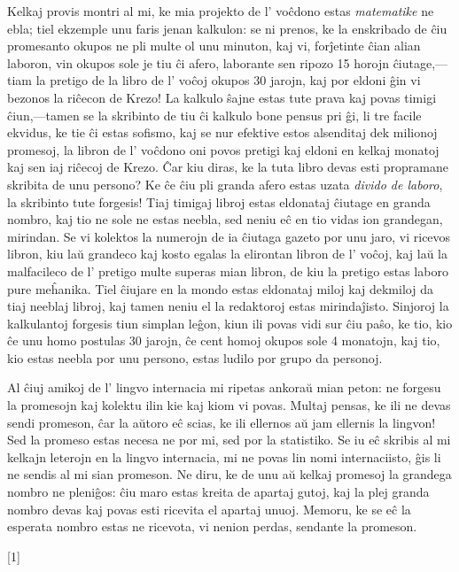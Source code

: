 \documentclass[ngerman,12pt,twoside]{book}
\begin{document}
Kelkaj provis montri al mi, ke mia projekto de l' voĉdono estas \emph{matematike} ne ebla; tiel ekzemple unu faris jenan kalkulon: \glqq{}se ni prenos, ke la enskribado de ĉiu promesanto okupos ne pli multe ol unu minuton, kaj vi, forĵetinte ĉian alian laboron, vin okupos sole je tiu ĉi afero, laborante sen ripozo 15 horojn ĉiutage,---tiam la pretigo de la libro de l' voĉoj okupos 30 jarojn, kaj por eldoni ĝin vi bezonos la riĉecon de Krezo!\grqq{} La kalkulo ŝajne estas tute prava kaj povas timigi ĉiun,---tamen se la skribinto de tiu ĉi kalkulo bone pensus pri ĝi, li tre facile ekvidus, ke tie ĉi estas sofismo, kaj se nur efektive estos alsenditaj dek milionoj promesoj, la libron de l' voĉdono oni povos pretigi kaj eldoni en kelkaj monatoj kaj sen iaj riĉecoj de Krezo. Ĉar kiu diras, ke la tuta libro devas esti propramane skribita de unu persono? Ke ĉe ĉiu pli granda afero estas uzata \emph{divido de laboro}, la skribinto tute forgesis! Tiaj \glqq{}timigaj\grqq{} libroj estas eldonataj ĉiutage en granda nombro, kaj tio ne sole ne estas neebla, sed neniu eĉ en tio vidas ion grandegan, mirindan. Se vi kolektos la numerojn de ia ĉiutaga gazeto por unu jaro, vi ricevos libron, kiu laŭ grandeco kaj kosto egalas la elirontan libron de l' voĉoj, kaj laŭ la malfacileco de l' pretigo multe superas mian libron, de kiu la pretigo estas laboro pure meĥanika. Tiel ĉiujare en la mondo estas eldonataj miloj kaj dekmiloj da tiaj \glqq{}neeblaj\grqq{} libroj, kaj tamen neniu el la redaktoroj estas mirindaĵisto. Sinjoroj la kalkulantoj forgesis tiun simplan leĝon, kiun ili povas vidi sur ĉiu paŝo, ke tio, kio ĉe unu homo postulas 30 jarojn, ĉe cent homoj okupos sole 4 monatojn, kaj tio, kio estas neebla por unu persono, estas ludilo por grupo da personoj.

Al ĉiuj amikoj de l' lingvo internacia mi ripetas ankoraŭ mian peton: ne forgesu la promesojn kaj kolektu ilin kie kaj kiom vi povas. Multaj pensas, ke ili ne devas sendi promeson, ĉar \glqq{}la aŭtoro eĉ scias, ke ili ellernos aŭ jam ellernis la lingvon\grqq{}! Sed la promeso estas necesa ne por mi, sed por la statistiko. Se iu eĉ skribis al mi kelkajn leterojn en la lingvo internacia, mi ne povas lin nomi internaciisto, ĝis li ne sendis al mi sian promeson. Ne diru, ke de unu aŭ kelkaj promesoj la grandega nombro ne pleniĝos: ĉiu maro estas kreita de apartaj gutoj, kaj la plej granda nombro devas kaj povas esti ricevita el apartaj unuoj. Memoru, ke se eĉ la esperata nombro estas ne ricevota, vi nenion perdas, sendante la promeson. 

\begin{center}
\scalebox{2}[1]{\large{}}
\end{center}
\end{document}
